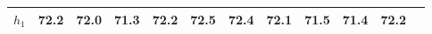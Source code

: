 
        \begin{tabular}{c|*{11}{c}}
            \hline
            \hline
                \(h_{1}\) &72.2 & 72.0 & 71.3 & 72.2 & 72.5 & 72.4 & 72.1 & 71.5 & 71.4 & 72.2 \\
            \hline
            \hline
        \end{tabular}
        